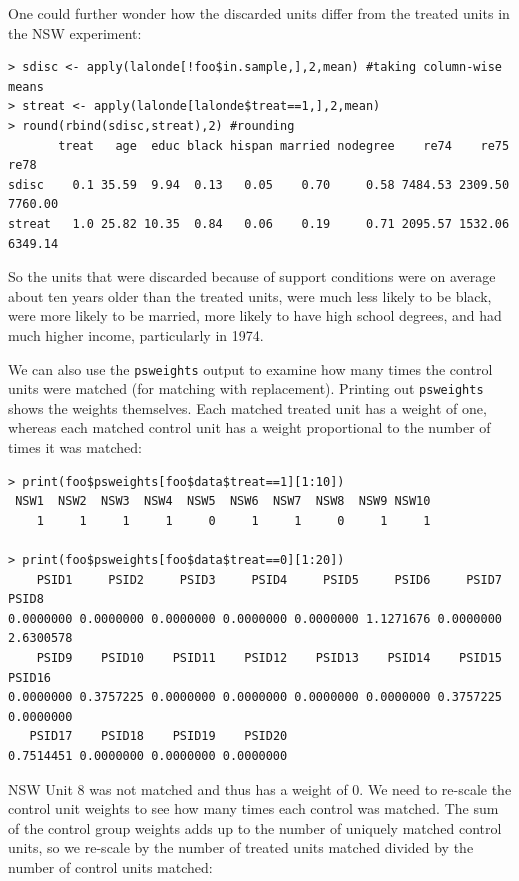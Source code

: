 \documentclass[oneside,letterpaper,titlepage]{article}
\begin{document}
One could further wonder how the discarded units differ from the
treated units in the NSW experiment:

\begin{verbatim}
> sdisc <- apply(lalonde[!foo$in.sample,],2,mean) #taking column-wise means
> streat <- apply(lalonde[lalonde$treat==1,],2,mean)
> round(rbind(sdisc,streat),2) #rounding
       treat   age  educ black hispan married nodegree    re74    re75    re78
sdisc    0.1 35.59  9.94  0.13   0.05    0.70     0.58 7484.53 2309.50 7760.00
streat   1.0 25.82 10.35  0.84   0.06    0.19     0.71 2095.57 1532.06 6349.14
\end{verbatim}

So the units that were discarded because of support conditions were on
average about ten years older than the treated units, were much less
likely to be black, were more likely to be married, more likely to
have high school degrees, and had much higher income, particularly in
1974.

We can also use the {\tt psweights} output to examine how many times
the control units were matched (for matching with replacement).
Printing out {\tt psweights} shows the weights themselves. Each
matched treated unit has a weight of one, whereas each matched control
unit has a weight proportional to the number of times it was matched:

\begin{verbatim}
> print(foo$psweights[foo$data$treat==1][1:10])
 NSW1  NSW2  NSW3  NSW4  NSW5  NSW6  NSW7  NSW8  NSW9 NSW10
    1     1     1     1     0     1     1     0     1     1

> print(foo$psweights[foo$data$treat==0][1:20])
    PSID1     PSID2     PSID3     PSID4     PSID5     PSID6     PSID7     PSID8
0.0000000 0.0000000 0.0000000 0.0000000 0.0000000 1.1271676 0.0000000 2.6300578
    PSID9    PSID10    PSID11    PSID12    PSID13    PSID14    PSID15    PSID16
0.0000000 0.3757225 0.0000000 0.0000000 0.0000000 0.0000000 0.3757225 0.0000000
   PSID17    PSID18    PSID19    PSID20
0.7514451 0.0000000 0.0000000 0.0000000
\end{verbatim}

NSW Unit 8 was not matched and thus has a weight of 0.  We need to
re-scale the control unit weights to see how many times each control
was matched.  The sum of the control group weights adds up to the
number of uniquely matched control units, so we re-scale by the number
of treated units matched divided by the number of control units
matched:
\end{document}
